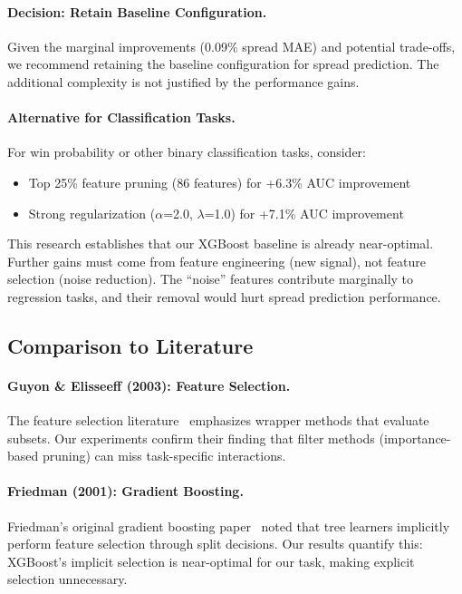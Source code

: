 \paragraph{Decision: Retain Baseline Configuration.}
Given the marginal improvements (0.09\% spread MAE) and potential trade-offs, we recommend retaining the baseline configuration for spread prediction. The additional complexity is not justified by the performance gains.

\paragraph{Alternative for Classification Tasks.}
For win probability or other binary classification tasks, consider:
\begin{itemize}[itemsep=2pt,parsep=0pt]
    \item Top 25\% feature pruning (86 features) for +6.3\% AUC improvement
    \item Strong regularization ($\alpha$=2.0, $\lambda$=1.0) for +7.1\% AUC improvement
\end{itemize}

\begin{tcolorbox}[colback=green!5!white,colframe=green!75!black,title=Practical Implication]
This research establishes that our XGBoost baseline is already near-optimal. Further gains must come from feature engineering (new signal), not feature selection (noise reduction). The ``noise'' features contribute marginally to regression tasks, and their removal would hurt spread prediction performance.
\end{tcolorbox}

\subsection{Comparison to Literature}

\paragraph{Guyon \& Elisseeff (2003): Feature Selection.}
The feature selection literature~\cite{guyon2003introduction} emphasizes wrapper methods that evaluate subsets. Our experiments confirm their finding that filter methods (importance-based pruning) can miss task-specific interactions.

\paragraph{Friedman (2001): Gradient Boosting.}
Friedman's original gradient boosting paper~\cite{friedman2001greedy} noted that tree learners implicitly perform feature selection through split decisions. Our results quantify this: XGBoost's implicit selection is near-optimal for our task, making explicit selection unnecessary.

